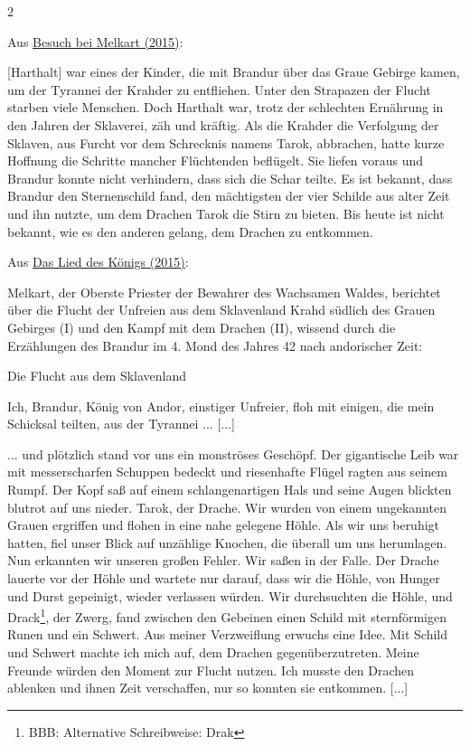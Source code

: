 \documentclass[10pt, a4paper, oneside]{book}
\begin{document}
\begin{multicols}{2}
\begin{center}
    Aus \hyperref[storytext-2015-besuch-bei-melkart]{Besuch bei Melkart (2015)}:
\end{center}

[Harthalt] war eines der Kinder, die mit Brandur über das Graue Gebirge kamen, um der Tyrannei der Krahder zu entfliehen. Unter den Strapazen der Flucht starben viele Menschen. Doch Harthalt war, trotz der schlechten Ernährung in den Jahren der Sklaverei, zäh und kräftig. Als die Krahder die Verfolgung der Sklaven, aus Furcht vor dem Schrecknis namens Tarok, abbrachen, hatte kurze Hoffnung die Schritte mancher Flüchtenden beflügelt. Sie liefen voraus und Brandur konnte nicht verhindern, dass sich die Schar teilte. Es ist bekannt, dass Brandur den Sternenschild fand, den mächtigsten der vier Schilde aus alter Zeit und ihn nutzte, um dem Drachen Tarok die Stirn zu bieten. Bis heute ist nicht bekannt, wie es den anderen gelang, dem Drachen zu entkommen.



\begin{center}
    Aus \hyperref[produkt-2015-das-lied-des-koenigs]{Das Lied des Königs (2015)}:
\end{center}

Melkart, der Oberste Priester der Bewahrer des Wachsamen Waldes, berichtet über die Flucht der Unfreien aus dem Sklavenland Krahd südlich des Grauen Gebirges (I) und den Kampf mit dem Drachen (II), wissend durch die Erzählungen des Brandur im 4. Mond des Jahres 42 nach andorischer Zeit:

Die Flucht aus dem Sklavenland
    
Ich, Brandur, König von Andor, einstiger Unfreier, floh mit einigen, die mein Schicksal teilten, aus der Tyrannei ... [...]\newpage %

... und plötzlich stand vor uns ein monströses Geschöpf. Der gigantische Leib war mit messerscharfen Schuppen bedeckt und riesenhafte Flügel ragten aus seinem Rumpf. Der Kopf saß auf einem schlangenartigen Hals und seine Augen blickten blutrot auf uns nieder. Tarok, der Drache. Wir wurden von einem ungekannten Grauen ergriffen und flohen in eine nahe gelegene Höhle. Als wir uns beruhigt hatten, fiel unser Blick auf unzählige Knochen, die überall um uns herumlagen. Nun erkannten wir unseren großen Fehler. Wir saßen in der Falle. Der Drache lauerte vor der Höhle und wartete nur darauf, dass wir die Höhle, von Hunger und Durst gepeinigt, wieder verlassen würden. Wir durchsuchten die Höhle, und Drack\footnote{BBB: Alternative Schreibweise: Drak}, der Zwerg, fand zwischen den Gebeinen einen Schild mit sternförmigen Runen und ein Schwert. Aus meiner Verzweiflung erwuchs eine Idee. Mit Schild und Schwert machte ich mich auf, dem Drachen gegenüberzutreten. Meine Freunde würden den Moment zur Flucht nutzen. Ich musste den Drachen ablenken und ihnen Zeit verschaffen, nur so konnten sie entkommen. [...]


\end{multicols}
\end{document}
